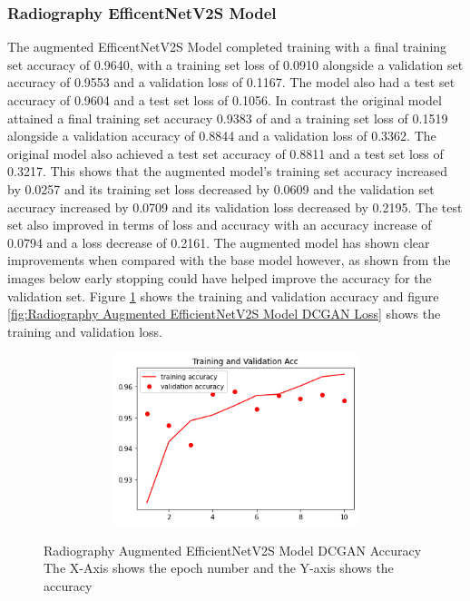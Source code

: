 \subsubsection{Radiography EfficentNetV2S Model}
The augmented EfficentNetV2S Model completed training with a final training set accuracy of 0.9640, with a training set loss of 0.0910 alongside a validation set accuracy of 0.9553 and a validation loss of 0.1167.  The model also had a test set accuracy of 0.9604 and a test set loss of 0.1056.  In contrast the original model attained a final training set accuracy 0.9383  of and a training set loss of 0.1519 alongside a validation accuracy of 0.8844 and a validation loss of 0.3362.  The original model also achieved a test set accuracy of 0.8811 and a test set loss of 0.3217.  This shows that the augmented model's training set accuracy increased by 0.0257 and its training set loss decreased by 0.0609 and the validation set accuracy increased by 0.0709 and its validation loss decreased by 0.2195.  The test set also improved in terms of loss and accuracy with an accuracy increase of 0.0794 and a loss decrease of 0.2161.   The augmented model has shown clear improvements when compared with the base model however, as shown from the images below early stopping could have helped improve the accuracy for the validation set. Figure \ref{fig:Radiography Augmented EfficientNetV2S Model DCGAN Accuracy} shows the training and validation accuracy and figure \ref{fig:Radiography Augmented EfficientNetV2S Model DCGAN Loss} shows the training and validation loss.
 \begin{figure}[H]
    \centering    \includegraphics[width=1\textwidth,height=5cm,keepaspectratio]{Images/EfficientNetV2SBaselineTrainingValidationAccRadiographyAugmentedDCGAN.png}\\
    \caption{Radiography Augmented EfficientNetV2S Model DCGAN Accuracy The X-Axis shows the epoch number and the Y-axis shows the accuracy} 
    \label{fig:Radiography Augmented EfficientNetV2S Model DCGAN Accuracy}
\end{figure}
